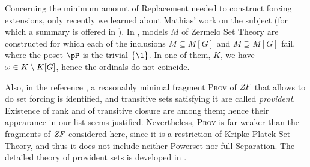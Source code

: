 Concerning the minimum amount of Replacement needed to construct
forcing extensions, only recently we learned about Mathias' work on the
subject (for which a summary is offered in
\cite[Sect.~6]{kanamori-mathias}). In
\cite[Sect.~1]{mathias:hal-01188043}, models $M$ of Zermelo Set Theory
are constructed for which each of the inclusions $M\subseteq M[G]$ and
$M\supseteq M[G]$ fail, where the poset $\pP$ is the trivial $\{\1
\}$. In one of them, $K$, we have $\omega\in K \setminus K[G]$, hence the
ordinals do not coincide.

Also, in the reference \cite{mathias-provident}, a reasonably minimal
fragment \textsc{Prov} of $\mathit{ZF}$ that allows to do set forcing is
identified, and transitive sets satisfying it are called
\emph{provident}. Existence of rank and of transitive closure are
among them; hence their appearance in our list seems
justified. Nevertheless, \textsc{Prov} is far weaker than the
fragments of $\mathit{ZF}$ considered here, since it is a restriction of
Kripke-Platek Set Theory, and thus it does not include neither
Powerset nor full Separation. The detailed theory of provident sets is
developed in \cite{mathias-bowler-gentle}. %




